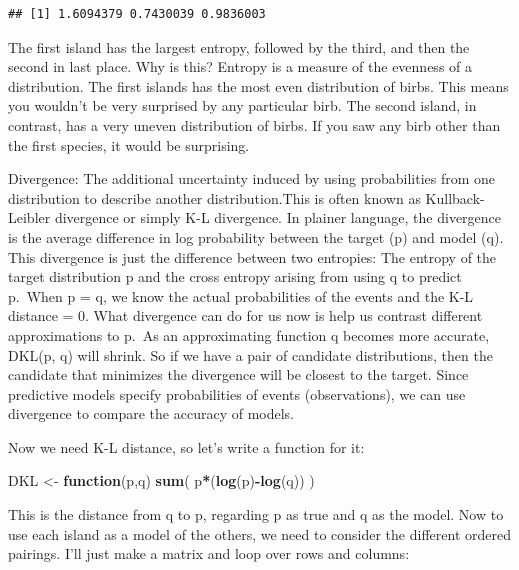 \documentclass[
]{article}
\newenvironment{Shaded}{\begin{snugshade}}{\end{snugshade}}
\newcommand{\ControlFlowTok}[1]{\textcolor[rgb]{0.13,0.29,0.53}{\textbf{#1}}}
\newcommand{\KeywordTok}[1]{\textcolor[rgb]{0.13,0.29,0.53}{\textbf{#1}}}
\newcommand{\NormalTok}[1]{#1}
\newcommand{\OperatorTok}[1]{\textcolor[rgb]{0.81,0.36,0.00}{\textbf{#1}}}
\newcommand{\StringTok}[1]{\textcolor[rgb]{0.31,0.60,0.02}{#1}}
\begin{document}
\begin{verbatim}
## [1] 1.6094379 0.7430039 0.9836003
\end{verbatim}

The first island has the largest entropy, followed by the third, and
then the second in last place. Why is this? Entropy is a measure of the
evenness of a distribution. The first islands has the most even
distribution of birbs. This means you wouldn't be very surprised by any
particular birb. The second island, in contrast, has a very uneven
distribution of birbs. If you saw any birb other than the first species,
it would be surprising.

Divergence: The additional uncertainty induced by using probabilities
from one distribution to describe another distribution.This is often
known as Kullback-Leibler divergence or simply K-L divergence. In
plainer language, the divergence is the average difference in log
probability between the target (p) and model (q). This divergence is
just the difference between two entropies: The entropy of the target
distribution p and the cross entropy arising from using q to predict
p.~When p = q, we know the actual probabilities of the events and the
K-L distance = 0. What divergence can do for us now is help us contrast
different approximations to p.~As an approximating function q becomes
more accurate, DKL(p, q) will shrink. So if we have a pair of candidate
distributions, then the candidate that minimizes the divergence will be
closest to the target. Since predictive models specify probabilities of
events (observations), we can use divergence to compare the accuracy of
models.

Now we need K-L distance, so let's write a function for it:

\begin{Shaded}
\begin{Highlighting}[]
\NormalTok{DKL <-}\StringTok{ }\ControlFlowTok{function}\NormalTok{(p,q) }\KeywordTok{sum}\NormalTok{( p}\OperatorTok{*}\NormalTok{(}\KeywordTok{log}\NormalTok{(p)}\OperatorTok{-}\KeywordTok{log}\NormalTok{(q)) )}
\end{Highlighting}
\end{Shaded}

This is the distance from q to p, regarding p as true and q as the
model. Now to use each island as a model of the others, we need to
consider the different ordered pairings. I'll just make a matrix and
loop over rows and columns:
\end{document}
